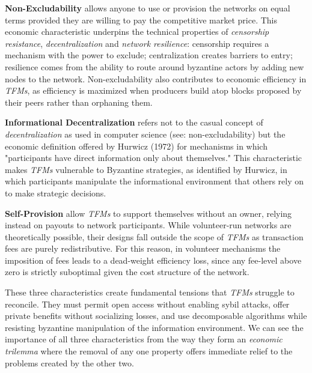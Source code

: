 \documentclass[sigconf,anonymous]{aamas}
\renewcommand{\paragraph}[1]{\smallskip\noindent\textbf{#1}}
\begin{document}
\paragraph{Non-Excludability} allows anyone to use or provision the networks on equal terms provided they are willing to pay the competitive market price. This economic characteristic underpins the technical properties of \textit{censorship resistance}, \textit{decentralization} and \textit{network resilience}: censorship requires a mechanism with the power to exclude; centralization creates barriers to entry; resilience comes from the ability to route around byzantine actors by adding new nodes to the network. Non-excludability also contributes to economic efficiency in \textit{TFMs}, as efficiency is maximized when producers build atop blocks proposed by their peers rather than orphaning them.

\paragraph{Informational Decentralization} refers not to the casual concept of \textit{decentralization} as used in computer science (see: non-excludability) but the economic definition offered by Hurwicz (1972) for mechanisms in which "participants have direct information only about themselves." This characteristic makes \textit{TFMs} vulnerable to Byzantine strategies, as identified by Hurwicz, in which participants manipulate the informational environment that others rely on to make strategic decisions.

\paragraph{Self-Provision} allow \textit{TFMs} to support themselves without an owner, relying instead on payouts to network participants. While volunteer-run networks are theoretically possible, their designs fall outside the scope of \textit{TFMs} as transaction fees are purely redistributive. For this reason, in volunteer mechanisms the imposition of fees leads to a dead-weight efficiency loss, since any fee-level above zero is strictly suboptimal given the cost structure of the network.

These three characteristics create fundamental tensions that \textit{TFMs} struggle to reconcile. They must permit open access without enabling sybil attacks, offer private benefits without socializing losses, and use decomposable algorithms while resisting byzantine manipulation of the information environment. We can see the importance of all three characteristics from the way they form an \emph{economic trilemma} where the removal of any one property offers immediate relief to the problems created by the other two.
\end{document}
